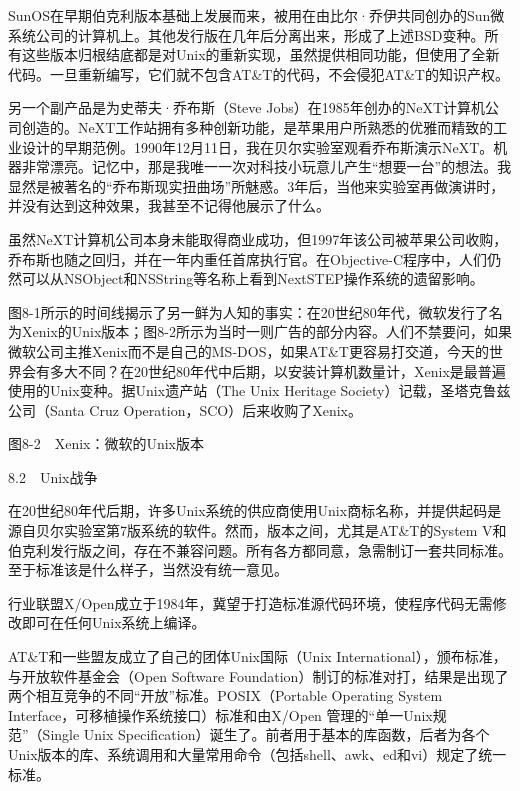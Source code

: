 \documentclass[a4paper,12pt,UTF8,twoside]{ctexbook}
\begin{document}
{{SunOS在早期伯克利版本基础上发展而来，被用在由比尔·乔伊共同创办的Sun微系统公司的计算机上。其他发行版在几年后分离出来，形成了上述BSD变种。所有这些版本归根结底都是对Unix的重新实现，虽然提供相同功能，但使用了全新代码。一旦重新编写，它们就不包含AT\&T的代码，不会侵犯AT\&T的知识产权。

另一个副产品是为史蒂夫·乔布斯（Steve Jobs）在1985年创办的NeXT计算机公司创造的。NeXT工作站拥有多种创新功能，是苹果用户所熟悉的优雅而精致的工业设计的早期范例。1990年12月11日，我在贝尔实验室观看乔布斯演示NeXT。机器非常漂亮。记忆中，那是我唯一一次对科技小玩意儿产生“想要一台”的想法。我显然是被著名的“乔布斯现实扭曲场”所魅惑。3年后，当他来实验室再做演讲时，并没有达到这种效果，我甚至不记得他展示了什么。

虽然NeXT计算机公司本身未能取得商业成功，但1997年该公司被苹果公司收购，乔布斯也随之回归，并在一年内重任首席执行官。在Objective-C程序中，人们仍然可以从NSObject和NSString等名称上看到NextSTEP操作系统的遗留影响。

图8-1所示的时间线揭示了另一鲜为人知的事实：在20世纪80年代，微软发行了名为Xenix的Unix版本；图8-2所示为当时一则广告的部分内容。人们不禁要问，如果微软公司主推Xenix而不是自己的MS-DOS，如果AT\&T更容易打交道，今天的世界会有多大不同？在20世纪80年代中后期，以安装计算机数量计，Xenix是最普遍使用的Unix变种。据Unix遗产站（The Unix Heritage Society）记载，圣塔克鲁兹公司（Santa Cruz Operation，SCO）后来收购了Xenix。



图8-2　Xenix：微软的Unix版本





8.2　Unix战争


在20世纪80年代后期，许多Unix系统的供应商使用Unix商标名称，并提供起码是源自贝尔实验室第7版系统的软件。然而，版本之间，尤其是AT\&T的System V和伯克利发行版之间，存在不兼容问题。所有各方都同意，急需制订一套共同标准。至于标准该是什么样子，当然没有统一意见。

行业联盟X/Open成立于1984年，冀望于打造标准源代码环境，使程序代码无需修改即可在任何Unix系统上编译。

AT\&T和一些盟友成立了自己的团体Unix国际（Unix International），颁布标准，与开放软件基金会（Open Software Foundation）制订的标准对打，结果是出现了两个相互竞争的不同“开放”标准。POSIX（Portable Operating System Interface，可移植操作系统接口）标准和由X/Open 管理的“单一Unix规范”（Single Unix Specification）诞生了。前者用于基本的库函数，后者为各个Unix版本的库、系统调用和大量常用命令（包括shell、awk、ed和vi）规定了统一标准。

}}
\end{document}
